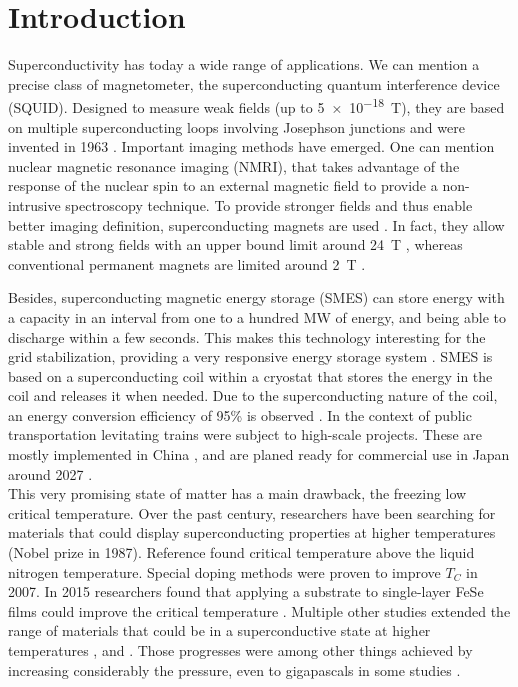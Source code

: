 \documentclass[../main.tex]{subfile}
\begin{document}
\section{Introduction}

Superconductivity has today a wide range of applications. We can mention a precise class of magnetometer, the superconducting quantum interference device (SQUID).
Designed to measure weak fields (up to \SI{5e-18}{\tesla})\cite{Range2004}, they are based on multiple superconducting loops involving Josephson junctions and were invented
in 1963 \cite{JAKLEVIC1964}.
Important imaging methods have emerged. One can mention nuclear magnetic resonance imaging (NMRI), that takes advantage of the response of the nuclear spin to an external 
magnetic field to provide a non-intrusive spectroscopy technique. To provide stronger fields and thus enable better imaging definition, superconducting magnets are used \cite{Nakamura2015}. In fact, they
allow stable and strong fields with an upper bound limit around \SI{24}{\tesla} \cite{Hashi2015}, whereas conventional permanent magnets are limited around \SI{2}{\tesla} \cite{Haishi2005}.

Besides, superconducting magnetic energy storage (SMES) can store energy with a capacity in an interval from one to a hundred \si{\mega\watt} of energy, and being able to discharge within a few seconds. This makes
this technology interesting for the grid stabilization, providing a very responsive energy storage system \cite{Tixador2008}.
SMES is based on a superconducting coil within a cryostat that stores the energy in the coil and releases it when needed. Due to the superconducting nature of the coil,
an energy conversion efficiency of 95\% is observed \cite{Tixador2008}.
In the context of public transportation levitating trains were subject to high-scale projects.
 These are mostly implemented in China \cite{Roque2024}, and are planed ready for commercial use in Japan around 2027 \cite{Nishijima2013}.\\

This very promising state of matter has a main drawback, the freezing low critical temperature. Over the past century, researchers 
have been searching for materials that could display superconducting properties at higher temperatures \cite{Bednorz1986} (Nobel prize in 1987).
Reference \cite{PhysRevLett.58.908} found critical temperature above the liquid nitrogen temperature.
Special doping methods were proven to improve $T_C$ \cite{Doiron-Leyraud2007} in 2007.
In 2015 researchers found that applying a substrate to single-layer FeSe films could improve the critical temperature \cite{Ge2015}.
Multiple other studies extended the range of materials that could be in a superconductive state at higher temperatures \cite{Einaga2016}, \cite{Drozdov_2019} and \cite{lee2023}.
Those progresses were among other things achieved by increasing considerably the pressure, even to gigapascals in some studies \cite{Drozdov_2019}.\\
\end{document}
